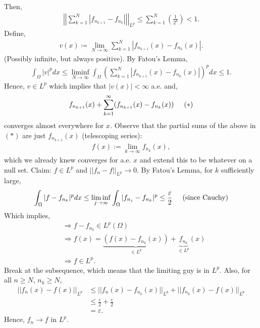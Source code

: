 \documentclass[psamsfonts]{amsart}
\theoremstyle{definition}
\theoremstyle{remark}
\newcommand{\eps}[0]{\varepsilon}
\numberwithin{equation}{section}
\begin{document}
Then, 
\begin{align*}
	\left| \left| \sum_{k=1}^N | f_{n_{k+1}} - f_{n_k} | \right| \right|_{L^p} \leq \sum_{k=1}^N \left( \frac{1}{2^k} \right) < 1. 
\end{align*}
Define, 
\begin{align*}
	v(x) \coloneqq \lim_{N \rightarrow \infty} \sum_{k=1}^N | f_{n_{k+1}}(x) - f_{n_k}(x) |.
\end{align*}
(Possibly infinite, but always positive). By Fatou's Lemma, 
\begin{align*}
	\int_{\Omega} |v|^p dx \leq \liminf_{N \rightarrow \infty} \int_{\Omega} \left( \sum_{k=1}^N |f_{n_{k+1}}(x) - f_{n_k}(x) | \right)^p dx  \leq 1. 
\end{align*}
Hence, \( v \in L^p \) which implies that \( |v(x)| < \infty \) a.e. and, 
\begin{align*}
	f_{n_{k+1}}(x) + \sum_{k=1}^\infty ( f_{n_{k+1}}(x) - f_{n_k} (x) ) \hspace{0.5cm} (*) 
\end{align*}
converges almost everywhere for \( x \). Observe that the partial sums of the above in \( (*) \) are just \( f_{n_{k+1}}(x) \) (telescoping series): 
\begin{align*}
	f(x) := \lim_{k \rightarrow \infty } f_{n_k} (x),
\end{align*}
which we already knew converges for a.e. \( x \) and extend this to be whatever on a null set. Claim: \( f \in L^p \) and \( ||f_n - f||_{L^p} \rightarrow 0 \). By Fatou's Lemma, for \(k \) sufficiently large, 
\begin{align*}
	\int_{\Omega} |f-f_{n_k} |^p dx \leq \liminf_{j \rightarrow \infty} \int_{\Omega} |f_{n_j} - f_{n_k} |^p \leq \frac{\eps}{2} \hspace{0.5cm} \text{(since Cauchy)}
\end{align*}
Which implies, 
\begin{align*}
	& \Rightarrow f- f_{n_k} \in L^p (\Omega) \\ 
	& \Rightarrow f(x) = \underbrace{(f(x) - f_{n_k}(x))}_{\in L^p} + \underbrace{f_{n_k}}_{\in L^p} (x) \\
	& \Rightarrow f \in L^p.
\end{align*}
Break at the subsequence, which means that the limiting guy is in \( L^p \). Also, for all \( n \geq N \), \( n_k \geq N \), 
\begin{align*}
	||f_n(x) - f(x) ||_{L^p} &  \leq || f_n(x) - f_{n_k} (x) ||_{L^p} + ||f_{n_k}(x) - f(x) ||_{L^p} \\
	& \leq \frac{\eps}{2} + \frac{\eps}{2} \\
	& = \eps.
\end{align*}
Hence, \( f_n \rightarrow f \) in \( L^p \).
\end{document}
